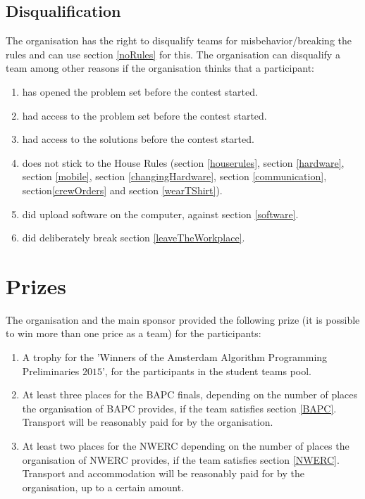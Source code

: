 \documentclass[11pt]{report}
\begin{document}
\section{Disqualification}
The organisation has the right to disqualify teams for misbehavior/breaking the rules and can use section \ref{noRules} for this. The organisation can disqualify a team among other reasons if the organisation thinks that a participant:
\begin{enumerate}[label=\bfseries 4.7.\arabic*]
\item \label{Problemset} has opened the problem set before the contest started.
\item \label{proofProblemset} had access to the problem set before the contest started.
\item \label{proofSolutions} had access to the solutions before the contest started.
\item does not stick to the House Rules (section \ref{houserules}, section \ref{hardware}, section \ref{mobile}, section \ref{changingHardware}, section \ref{communication}, section\ref{crewOrders} and section \ref{wearTShirt}).
\item did upload software on the computer, against section \ref{software}.
\item did deliberately break section \ref{leaveTheWorkplace}.
\end{enumerate}

\chapter{Prizes}
The organisation and the main sponsor provided the following prize (it is possible to win more than one price as a team) for the participants:
\begin{enumerate}[label=\bfseries 5.\arabic*]
\item A trophy for the 'Winners of the Amsterdam Algorithm Programming Preliminaries $2015$', for the participants in the student teams pool.
\item At least three places for the BAPC finals, depending on the number of places the organisation of BAPC provides, if the team satisfies section \ref{BAPC}. Transport will be reasonably paid for by the organisation.
\item At least two places for the NWERC depending on the number of places the organisation of NWERC provides, if the team satisfies section \ref{NWERC}. Transport and accommodation will be reasonably paid for by the organisation, up to a certain amount. 
\end{enumerate}
\end{document}
